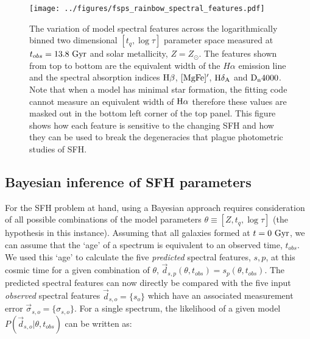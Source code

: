 \documentclass[useAMS,usenatbib]{mn2e}
\begin{document}
\begin{figure}
\centering
\texttt{[image: ../figures/fsps\_rainbow\_spectral\_features.pdf]}
\caption{The variation of model spectral features across the logarithmically binned two dimensional $[t_q, \log \tau]$ parameter space measured at $t_{obs}=13.8~\rm{Gyr}$ and solar metallicity, $Z=Z_{\odot}$. The features shown from top to bottom are the equivalent width of the $H\alpha$ emission line and the spectral absorption indices $\rm{H}\beta$, $[\rm{MgFe}]^{\prime}$, $\rm{H}\delta_A$ and $\rm{D}_n4000$. Note that when a model has minimal star formation, the fitting code cannot measure an equivalent width of $\rm{H}\alpha$ therefore these values are masked out in the bottom left corner of the top panel. This figure shows how each feature is sensitive to the changing SFH and how they can be used to break the degeneracies that plague photometric studies of SFH. }
\label{fig:rainbow}
\end{figure}

\subsection{Bayesian inference of SFH parameters}\label{sec:emcee}

For the SFH problem at hand, using a Bayesian approach requires consideration of all possible combinations of the model parameters $\theta \equiv [Z, t_{q}, \log \tau]$ (the hypothesis in this instance). Assuming that all galaxies formed at $t=0~\rm{Gyr}$, we can assume that the `age' of a spectrum is equivalent to an observed time, $t_{obs}$. We used this  `age' to calculate the five \emph{predicted} spectral features, $s,p$, at this cosmic time for a given combination of $\theta$, $\vec{d}_{s,p}(\theta, t_{obs}) = {s_p(\theta, t_{obs})}$. The predicted spectral features can now directly be compared with the five input \emph{observed} spectral features $\vec{d}_{s, o} = \{s_o\}$ which have an associated measurement error $\vec{\sigma}_{s, o} = \{\sigma_{s, o}\}$. For a single spectrum, the likelihood of a given model $P(\vec{d}_{s, o}|\theta, t_{obs})$ can be written as:


\end{document}
